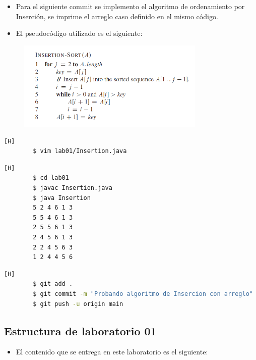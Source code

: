 \documentclass{article}
\begin{document}
	\begin{itemize}	
		\item Para el siguiente commit se implemento el algoritmo de ordenamiento por Inserción, se imprime el arreglo caso definido en el mismo código.
		\item El pseudocódigo utilizado es el siguiente:
	\end{itemize}	
	
	\begin{figure}[H]
		\centering
		\includegraphics[width=0.8\textwidth,keepaspectratio]{img/pseudocodigo_insercion.png}
	\end{figure}
	
	\clearpage
	
	\begin{lstlisting}[language=bash,caption={Creando .gitignore}][H]
		$ vim lab01/Insertion.java
	\end{lstlisting}

	
	\begin{lstlisting}[language=bash,caption={Compilando y probando código}][H]
		$ cd lab01
		$ javac Insertion.java
		$ java Insertion
		5 2 4 6 1 3 
		5 5 4 6 1 3 
		2 5 5 6 1 3 
		2 4 5 6 1 3 
		2 2 4 5 6 3 
		1 2 4 4 5 6
	\end{lstlisting}
	\begin{lstlisting}[language=bash,caption={Commit: Probando algoritmo de Inserción con arreglo}][H]
		$ git add .
		$ git commit -m "Probando algoritmo de Insercion con arreglo"			
		$ git push -u origin main
	\end{lstlisting}
	
		
	\subsection{Estructura de laboratorio 01}
	\begin{itemize}	
		\item El contenido que se entrega en este laboratorio es el siguiente:
	\end{itemize}
	
\end{document}
